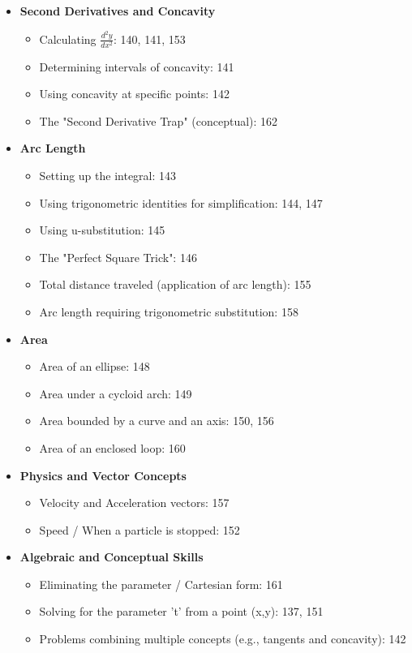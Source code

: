 \documentclass{article}
\begin{document}
\begin{itemize}
    \item \textbf{Second Derivatives and Concavity}
    \begin{itemize}
        \item Calculating $\frac{d^2y}{dx^2}$: 140, 141, 153
        \item Determining intervals of concavity: 141
        \item Using concavity at specific points: 142
        \item The "Second Derivative Trap" (conceptual): 162
    \end{itemize}

    \item \textbf{Arc Length}
    \begin{itemize}
        \item Setting up the integral: 143
        \item Using trigonometric identities for simplification: 144, 147
        \item Using u-substitution: 145
        \item The "Perfect Square Trick": 146
        \item Total distance traveled (application of arc length): 155
        \item Arc length requiring trigonometric substitution: 158
    \end{itemize}

    \item \textbf{Area}
    \begin{itemize}
        \item Area of an ellipse: 148
        \item Area under a cycloid arch: 149
        \item Area bounded by a curve and an axis: 150, 156
        \item Area of an enclosed loop: 160
    \end{itemize}
    
    \item \textbf{Physics and Vector Concepts}
    \begin{itemize}
        \item Velocity and Acceleration vectors: 157
        \item Speed / When a particle is stopped: 152
    \end{itemize}

    \item \textbf{Algebraic and Conceptual Skills}
    \begin{itemize}
        \item Eliminating the parameter / Cartesian form: 161
        \item Solving for the parameter 't' from a point (x,y): 137, 151
        \item Problems combining multiple concepts (e.g., tangents and concavity): 142
    \end{itemize}
\end{itemize}
\end{document}
